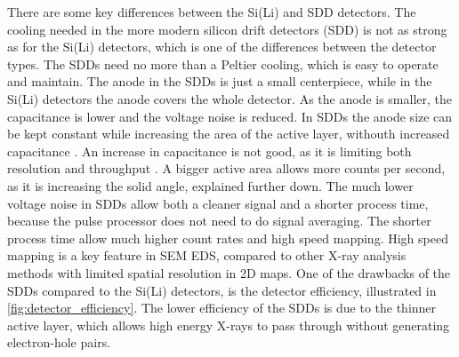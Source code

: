There are some key differences between the Si(Li) and SDD detectors.%
The cooling needed in the more modern silicon drift detectors (SDD) is not as strong as for the Si(Li) detectors, which is one of the differences between the detector types.
The SDDs need no more than a Peltier cooling, which is easy to operate and maintain.
The anode in the SDDs is just a small centerpiece, while in the Si(Li) detectors the anode covers the whole detector.
As the anode is smaller, the capacitance is lower and the voltage noise is reduced.
In SDDs the anode size can be kept constant while increasing the area of the active layer, withouth increased capacitance \cite{notaros_electromagnetics_2010}.
An increase in capacitance is not good, as it is limiting both resolution and throughput \cite[Ch. 16.3.9]{goldstein_scanning_2018}.
A bigger active area allows more counts per second, as it is increasing the solid angle, explained further down.
The much lower voltage noise in SDDs allow both a cleaner signal and a shorter process time, because the pulse processor does not need to do signal averaging.
The shorter process time allow much higher count rates and high speed mapping.
High speed mapping is a key feature in SEM EDS, compared to other X-ray analysis methods with limited spatial resolution in 2D maps.
One of the drawbacks of the SDDs compared to the Si(Li) detectors, is the detector efficiency, illustrated in \cref{fig:detector_efficiency}.
The lower efficiency of the SDDs is due to the thinner active layer, which allows high energy X-rays to pass through without generating electron-hole pairs.


